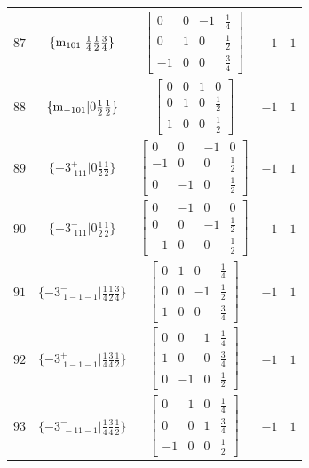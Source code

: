 \documentclass[fleqn,8pt]{jsarticle}
\begin{document}
\begin{longtable}{ccccc}
$ 87 $ & $ \{{\rm m}_{101}|\frac{1}{4} \frac{1}{2} \frac{3}{4}\} $ & $ \begin{bmatrix} 0 & 0 & -1 & \frac{1}{4} \\ 0 & 1 & 0 & \frac{1}{2} \\ -1 & 0 & 0 & \frac{3}{4} \end{bmatrix} $ & $ -1 $ & $ 1 $ \\ \hline
$ 88 $ & $ \{{\rm m}_{-101}|0 \frac{1}{2} \frac{1}{2}\} $ & $ \begin{bmatrix} 0 & 0 & 1 & 0 \\ 0 & 1 & 0 & \frac{1}{2} \\ 1 & 0 & 0 & \frac{1}{2} \end{bmatrix} $ & $ -1 $ & $ 1 $ \\ \hline
$ 89 $ & $ \{-3^{+}_{\,\,111}|0 \frac{1}{2} \frac{1}{2}\} $ & $ \begin{bmatrix} 0 & 0 & -1 & 0 \\ -1 & 0 & 0 & \frac{1}{2} \\ 0 & -1 & 0 & \frac{1}{2} \end{bmatrix} $ & $ -1 $ & $ 1 $ \\ \hline
$ 90 $ & $ \{-3^{-}_{\,\,111}|0 \frac{1}{2} \frac{1}{2}\} $ & $ \begin{bmatrix} 0 & -1 & 0 & 0 \\ 0 & 0 & -1 & \frac{1}{2} \\ -1 & 0 & 0 & \frac{1}{2} \end{bmatrix} $ & $ -1 $ & $ 1 $ \\ \hline
$ 91 $ & $ \{-3^{-}_{\,\,1-1-1}|\frac{1}{4} \frac{1}{2} \frac{3}{4}\} $ & $ \begin{bmatrix} 0 & 1 & 0 & \frac{1}{4} \\ 0 & 0 & -1 & \frac{1}{2} \\ 1 & 0 & 0 & \frac{3}{4} \end{bmatrix} $ & $ -1 $ & $ 1 $ \\ \hline
$ 92 $ & $ \{-3^{+}_{\,\,1-1-1}|\frac{1}{4} \frac{3}{4} \frac{1}{2}\} $ & $ \begin{bmatrix} 0 & 0 & 1 & \frac{1}{4} \\ 1 & 0 & 0 & \frac{3}{4} \\ 0 & -1 & 0 & \frac{1}{2} \end{bmatrix} $ & $ -1 $ & $ 1 $ \\ \hline
$ 93 $ & $ \{-3^{-}_{\,\,-11-1}|\frac{1}{4} \frac{3}{4} \frac{1}{2}\} $ & $ \begin{bmatrix} 0 & 1 & 0 & \frac{1}{4} \\ 0 & 0 & 1 & \frac{3}{4} \\ -1 & 0 & 0 & \frac{1}{2} \end{bmatrix} $ & $ -1 $ & $ 1 $ \\ \hline

\end{longtable}
\end{document}
